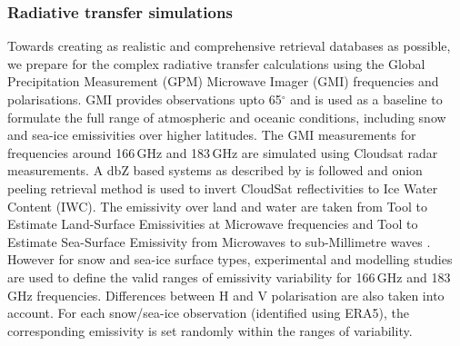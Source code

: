 \documentclass[12pt,oneside,a4paper]{article}
\begin{document}
\subsubsection{Radiative transfer simulations}
%
Towards creating as realistic and comprehensive retrieval databases as possible, we prepare for the complex radiative transfer calculations using the Global Precipitation Measurement (GPM) Microwave Imager (GMI) frequencies and polarisations. GMI provides observations upto 65$^{\circ}$ and is used as a baseline to formulate the full range of atmospheric and oceanic conditions, including snow and sea-ice emissivities over higher latitudes. The GMI measurements for frequencies around 166\,GHz and 183\,GHz are simulated using Cloudsat radar measurements. A dbZ based systems as described by \citet{ekelund:using:20} is followed and onion peeling retrieval method is used to invert CloudSat reflectivities to Ice Water Content (IWC). The emissivity over land and water are taken from Tool to Estimate Land-Surface Emissivities at Microwave frequencies \citep{aires} and Tool to Estimate Sea-Surface Emissivity from Microwaves to sub-Millimetre waves \citep{prigent}. However for snow and sea-ice surface types, experimental and modelling studies \citep{harlow:2009:milli, harlow:2012:tundr,hewison:2002:airbo} are used to define the valid ranges of emissivity variability for 166\,GHz and 183 \,GHz frequencies. Differences between H and V polarisation are also taken into account. For each snow/sea-ice observation (identified using ERA5), the corresponding emissivity is set randomly within the ranges of variability.
\end{document}
